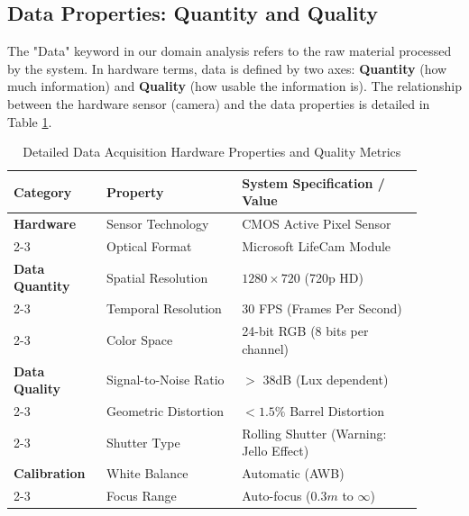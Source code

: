 \newpage

\subsection{Data Properties: Quantity and Quality}

The "Data" keyword in our domain analysis refers to the raw material processed by the system. In hardware terms, data is defined by two axes: \textbf{Quantity} (how much information) and \textbf{Quality} (how usable the information is). The relationship between the hardware sensor (camera) and the data properties is detailed in Table \ref{tab:hardware_properties}.

\begin{table}[h!]
	\centering
	\caption{Detailed Data Acquisition Hardware Properties and Quality Metrics}
	\label{tab:hardware_properties}
	\renewcommand{\arraystretch}{1.6}
	\setlength{\tabcolsep}{10pt}
	\begin{tabular}{|p{0.2\linewidth}|p{0.3\linewidth}|p{0.4\linewidth}|}
		\hline 
		\textbf{Category} & \textbf{Property} & \textbf{System Specification / Value} \\ \hline
		\textbf{Hardware} & Sensor Technology & CMOS Active Pixel Sensor \\ \cline{2-3}
		& Optical Format & Microsoft LifeCam Module \\ \hline
		
		\textbf{Data Quantity} & Spatial Resolution & $1280 \times 720$ (720p HD) \\ \cline{2-3}
		& Temporal Resolution & 30 FPS (Frames Per Second) \\ \cline{2-3}
		& Color Space & 24-bit RGB (8 bits per channel) \\ \hline
		
		\textbf{Data Quality} & Signal-to-Noise Ratio & $>$ 38dB (Lux dependent) \\ \cline{2-3}
		& Geometric Distortion & $< 1.5\%$ Barrel Distortion \\ \cline{2-3}
		& Shutter Type & Rolling Shutter (Warning: Jello Effect) \\ \hline
		
		\textbf{Calibration} & White Balance & Automatic (AWB) \\ \cline{2-3}
		& Focus Range & Auto-focus ($0.3m$ to $\infty$) \\ \hline
	\end{tabular}
\end{table}

